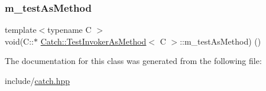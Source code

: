 \subsubsection{\texorpdfstring{m\_testAsMethod}{m\_testAsMethod}}
{\footnotesize\ttfamily template$<$typename C $>$ \\
void(C\+::$\ast$ \mbox{\hyperlink{class_catch_1_1_test_invoker_as_method}{Catch\+::\+Test\+Invoker\+As\+Method}}$<$ C $>$\+::m\+\_\+test\+As\+Method) ()\hspace{0.3cm}{\ttfamily [private]}}



The documentation for this class was generated from the following file\+:\begin{DoxyCompactItemize}
\item 
include/\mbox{\hyperlink{catch_8hpp}{catch.\+hpp}}\end{DoxyCompactItemize}
